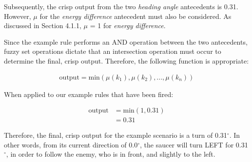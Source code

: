 \noindent
Subsequently, the crisp output from the two \emph{heading angle} antecedents is 0.31. However, $\mu$ for the \emph{energy difference} antecedent must also be considered. As discussed in Section 4.1.1, $\mu$ = 1 for \emph{energy difference}.

Since the example rule performs an AND operation between the two antecedents, fuzzy set operations dictate that an intersection operation must occur to determine the final, crisp output. Therefore, the following function is appropriate:

{\LARGE
	\begin{align}
	\mbox{output} = \mbox{min}(\mu(k_1), \mu(k_2), \mbox{...}, \mu(k_n))
	\end{align}
}

\noindent
When applied to our example rules that have been fired:

{\LARGE
	\begin{align}
	\mbox{output} &= \mbox{min}(1, 0.31) \\
	&= 0.31
	\end{align}
}

\noindent
Therefore, the final, crisp output for the example scenario is a turn of 0.31$^{\circ}$. In other words, from its current direction of 0.0$^{\circ}$, the saucer will turn LEFT for 0.31$^{\circ}$, in order to follow the enemy, who is in front, and slightly to the left.